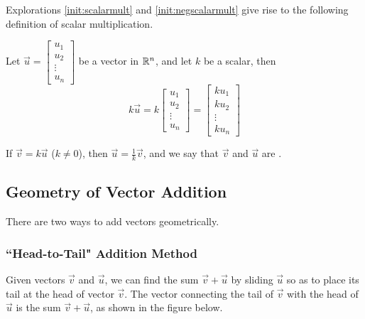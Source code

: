 \documentclass{ximera}
\begin{document}
Explorations  \ref{init:scalarmult} and \ref{init:negscalarmult} give rise to the following definition of scalar multiplication.


  \begin{definition}\label{def:scalarmult} 
  
Let $\vec{u}=\begin{bmatrix}
u_1\\
u_2\\
\vdots\\
u_n
\end{bmatrix}$ be a vector in $\mathbb{R}^n$, and let $k$ be a scalar, then
  $$k\vec{u}=k\begin{bmatrix}
u_1\\
u_2\\
\vdots\\
u_n
\end{bmatrix}=\begin{bmatrix}
ku_1\\
ku_2\\
\vdots\\
ku_n
\end{bmatrix}$$
  \end{definition}
If $\vec{v}=k\vec{u}$ ($k\neq 0$), then $\vec{u}=\frac{1}{k}\vec{v}$, and we say that $\vec{v}$ and $\vec{u}$ are .

\subsection*{Geometry of Vector Addition} 
There are two ways to add vectors geometrically.  
\subsubsection*{``Head-to-Tail" Addition Method}
Given vectors $\vec{v}$ and $\vec{u}$, we can find the sum $\vec{v}+\vec{u}$ by sliding $\vec{u}$ so as to place its tail at the head of vector $\vec{v}$.  The vector connecting the tail of $\vec{v}$ with the head of $\vec{u}$ is the sum $\vec{v}+\vec{u}$, as shown in the figure below.    
\begin{center}
\end{center}
\end{document}
